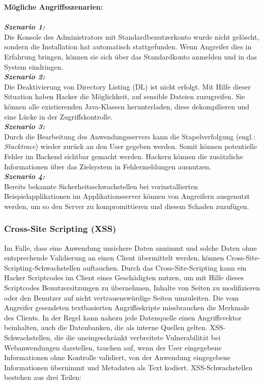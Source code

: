\textbf{Mögliche Angriffsszenarien:}\\
\\
\textbf{\textit{Szenario 1:}}\\

Die Konsole des Administrators mit Standardbenutzerkonto wurde nicht gelöscht, sondern die Installation hat automatisch stattgefunden. Wenn Angreifer dies in Erfahrung bringen, können sie sich über das Standardkonto anmelden und in das System eindringen\cite{owasp13top10}.\\

\textbf{\textit{Szenario 2:}}\\

Die Deaktivierung von Directory Listing (DL) ist nicht erfolgt. Mit Hilfe dieser Situation haben Hacker die Möglichkeit, auf sensible Dateien zuzugreifen. Sie können alle existierenden Java-Klassen herunterladen, diese dekompilieren und eine Lücke in der  Zugriffskontrolle\cite{owasp13top10}.\\

\textbf{\textit{Szenario 3:}}\\

Durch die Bearbeitung des Anwendungsservers kann die Stapelverfolgung (engl.: \textit{Stacktrace}) wieder zurück an den User gegeben werden. Somit können potentielle Fehler im Backend sichtbar gemacht werden. Hackern können die zusätzliche Informationen über das Zielsystem in Fehlermeldungen ausnutzen\cite{owasp13top10}.\\

\textbf{\textit{Szenario 4:}}\\

Bereits bekannte Sicherheitsschwachstellen bei vorinstallierten Beispielapplikationen im Applikationsserver können von Angreifern ausgenutzt werden, um so den Server zu kompromittieren und diesem Schaden zuzufügen\cite{owasp13top10}.\\

\subsubsection{Cross-Site Scripting (XSS)}

Im Falle, dass eine Anwendung unsichere Daten annimmt und solche Daten ohne entsprechende Validierung an einen Client übermittelt werden, können Cross-Site-Scripting-Schwachstellen auftauchen. Durch das Cross-Site-Scripting kann ein Hacker Scriptcodes im Client eines Geschädigten nutzen, um mit Hilfe dieses Scriptcodes Benutzersitzungen zu übernehmen, Inhalte von Seiten zu modifizieren oder den Benutzer auf nicht vertrauenswürdige Seiten umzuleiten. Die vom Angreifer gesendeten textbasierten Angriffsskripte missbrauchen die Merkmale des Clients. In der Regel kann nahezu jede Datenquelle einen Angriffsvektor beinhalten, auch die Datenbanken, die als interne Quellen gelten. XSS-Schwachstellen, die die uneingeschränkt verbreitete Vulnerabilität bei Webanwendungen darstellen, tauchen auf, wenn der User eingegebene Informationen ohne Kontrolle validiert, von der Anwendung eingegebene Informationen übernimmt und Metadaten als Text kodiert. XSS-Schwachstellen bestehen aus drei Teilen\cite{owasp13top10}:\\

